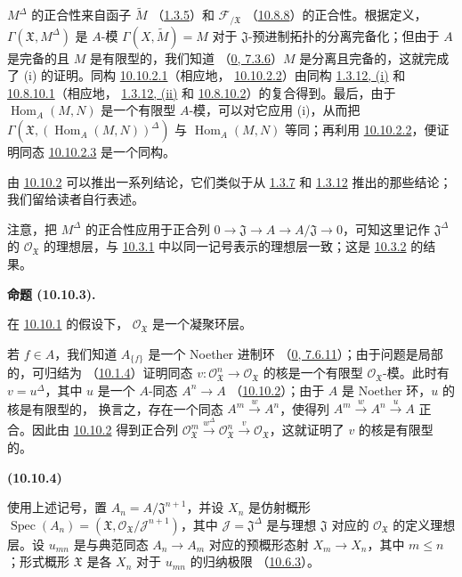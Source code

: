 \documentclass[UTF8,fontset=none,11pt,oneside,openany]{ctexbook}
\newenvironment{env}[1][]{%
  \par\medskip\noindent\textbf{(#1)}\ %
}{\par}
\newenvironment{proposition}[1][]{%
  \par\medskip\noindent\textbf{命题 (#1).}\ %
}{\par}
\newcommand{\oldpage}[2][]{%
  \hypertarget{ega-source-page-#1-#2}{}%
  \marginnote{\scriptsize\textbf{#1}~|~#2}\ignorespaces}
\let\EGAOriginalLabel\label
\renewcommand{\label}[1]{\phantomsection\EGAOriginalLabel{#1}}
\begin{document}
$M^\Delta$ 的正合性来自函子 $\widetilde M$
（\hyperref[I.1.3.5-fr]{1.3.5}）和 $\mathscr{F}_{/\mathfrak{X}}$
（\hyperref[I.10.8.8-fr]{10.8.8}）的正合性。根据定义，
$\Gamma(\mathfrak{X},M^\Delta)$ 是 $A$-模
$\Gamma(X,\widetilde M)=M$ 对于 $\mathfrak{J}$-预进制拓扑的分离完备化；但由于
$A$ 是完备的且 $M$ 是有限型的，我们知道
（\hyperref[0.7.3.6-fr]{0, 7.3.6}）$M$ 是分离且完备的，这就完成了
(i) 的证明。同构
\hyperref[I.10.10.2.1-fr]{10.10.2.1}（相应地，
\hyperref[I.10.10.2.2-fr]{10.10.2.2}）由同构
\hyperref[I.1.3.12-fr]{1.3.12, (i)} 和
\hyperref[I.10.8.10.1-fr]{10.8.10.1}（相应地，
\hyperref[I.1.3.12-fr]{1.3.12, (ii)} 和
\hyperref[I.10.8.10.2-fr]{10.8.10.2}）的复合得到。最后，由于
$\operatorname{Hom}_A(M,N)$ 是一个有限型 $A$-模，可以对它应用 (i)，从而把
$\Gamma(\mathfrak{X},(\operatorname{Hom}_A(M,N))^\Delta)$ 与
$\operatorname{Hom}_A(M,N)$ 等同；再利用
\hyperref[I.10.10.2.2-fr]{10.10.2.2}，便证明同态
\hyperref[I.10.10.2.3-fr]{10.10.2.3} 是一个同构。

由 \hyperref[I.10.10.2-fr]{10.10.2} 可以推出一系列结论，它们类似于从
\hyperref[I.1.3.7-fr]{1.3.7} 和
\hyperref[I.1.3.12-fr]{1.3.12} 推出的那些结论；我们留给读者自行表述。
\oldpage[I]{202}

注意，把 $M^\Delta$ 的正合性应用于正合列
$0\to\mathfrak{J}\to A\to A/\mathfrak{J}\to0$，可知这里记作
$\mathfrak{J}^\Delta$ 的 $\mathscr{O}_{\mathfrak{X}}$ 的理想层，与
\hyperref[I.10.3.1-fr]{10.3.1} 中以同一记号表示的理想层一致；这是
\hyperref[I.10.3.2-fr]{10.3.2} 的结果。

\begin{proposition}[10.10.3]
\label{I.10.10.3-fr}
在 \hyperref[I.10.10.1-fr]{10.10.1} 的假设下，
$\mathscr{O}_{\mathfrak{X}}$ 是一个凝聚环层。
\end{proposition}

若 $f\in A$，我们知道 $A_{\{f\}}$ 是一个 Noether 进制环
（\hyperref[0.7.6.11-fr]{0, 7.6.11}）；由于问题是局部的，可归结为
（\hyperref[I.10.1.4-fr]{10.1.4}）证明同态
$v:\mathscr{O}_{\mathfrak{X}}^n\to\mathscr{O}_{\mathfrak{X}}$ 的核是一个有限型
$\mathscr{O}_{\mathfrak{X}}$-模。此时有 $v=u^\Delta$，其中 $u$ 是一个
$A$-同态 $A^n\to A$
（\hyperref[I.10.10.2-fr]{10.10.2}）；由于 $A$ 是 Noether 环，$u$ 的核是有限型的，
换言之，存在一个同态 $A^m\xrightarrow{w}A^n$，使得列
$A^m\xrightarrow{w}A^n\xrightarrow{u}A$ 正合。因此由
\hyperref[I.10.10.2-fr]{10.10.2} 得到正合列
$\mathscr{O}_{\mathfrak{X}}^m\xrightarrow{w^\Delta}
\mathscr{O}_{\mathfrak{X}}^n\xrightarrow{v}
\mathscr{O}_{\mathfrak{X}}$，这就证明了 $v$ 的核是有限型的。

\begin{env}[10.10.4]
\label{I.10.10.4-fr}
使用上述记号，置 $A_n=A/\mathfrak{J}^{n+1}$，并设 $X_n$ 是仿射概形
$\operatorname{Spec}(A_n)=(\mathfrak{X},
\mathscr{O}_{\mathfrak{X}}/\mathscr{J}^{n+1})$，其中
$\mathscr{J}=\mathfrak{J}^\Delta$ 是与理想 $\mathfrak{J}$ 对应的
$\mathscr{O}_{\mathfrak{X}}$ 的定义理想层。设 $u_{mn}$ 是与典范同态
$A_n\to A_m$ 对应的预概形态射 $X_m\to X_n$，其中
$m\leq n$；形式概形 $\mathfrak{X}$ 是各 $X_n$ 对于 $u_{mn}$ 的归纳极限
（\hyperref[I.10.6.3-fr]{10.6.3}）。
\end{env}
\end{document}
